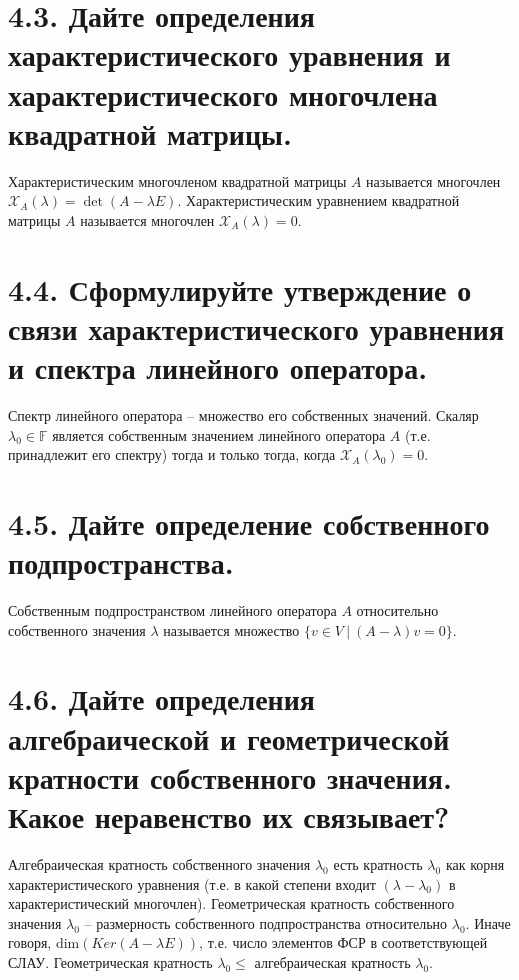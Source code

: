 \documentclass{article}
\begin{document}
\section*{\LARGE 4.3. Дайте определения характеристического уравнения и характеристического многочлена квадратной матрицы.}
Характеристическим многочленом квадратной матрицы $A$ называется многочлен $\mathcal{X}_A(\lambda) = \det{(A - \lambda E)}$.
\newline Характеристическим уравнением квадратной матрицы $A$ называется многочлен $\mathcal{X}_A(\lambda) = 0$.

\section*{\LARGE 4.4. Сформулируйте утверждение о связи характеристического уравнения и спектра линейного оператора.}
Спектр линейного оператора -- множество его собственных значений.
\newline Скаляр $\lambda_0 \in \mathbb{F}$ является собственным значением линейного оператора $A$ (т.е. принадлежит его спектру) тогда и только тогда, когда $\mathcal{X}_A(\lambda_0) = 0$.

\section*{\LARGE 4.5. Дайте определение собственного подпространства.}
Собственным подпространством линейного оператора $A$ относительно собственного значения $\lambda$ называется множество $\{v \in V \:|\: (A - \lambda)v = 0\}$.

\section*{\LARGE 4.6. Дайте определения алгебраической и геометрической кратности собственного значения. Какое неравенство их связывает?}
Алгебраическая кратность собственного значения $\lambda_0$ есть кратность $\lambda_0$ как корня характеристического уравнения (т.е. в какой степени входит $(\lambda - \lambda_0)$ в характеристический многочлен).
\newline Геометрическая кратность собственного значения $\lambda_0$ -- размерность собственного подпространства относительно $\lambda_0$. Иначе говоря, dim$(Ker(A - \lambda E))$, т.е. число элементов ФСР в соответствующей СЛАУ.
\newline Геометрическая кратность $\lambda_0 \le$ алгебраическая кратность $\lambda_0$. 
\end{document}
